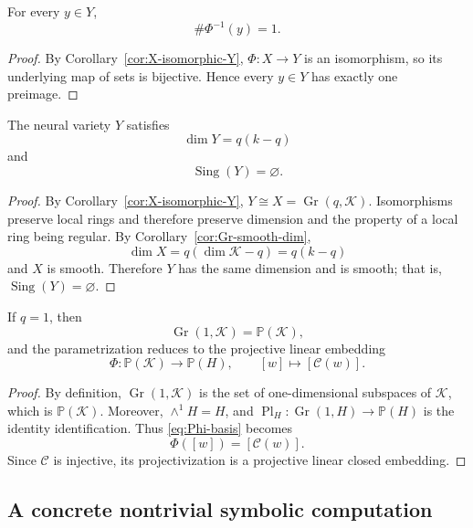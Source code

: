 \documentclass{siamonline250211}
\newcommand{\PP}{\mathbb P}
\newcommand{\Gr}{\operatorname{Gr}}
\newcommand{\Pl}{\operatorname{Pl}}
\newcommand{\Sing}{\operatorname{Sing}}
\newcommand{\cK}{\mathcal K}
\newcommand{\cC}{\mathcal C}
\begin{document}
\begin{corollary}\label{cor:fibers}
For every $y\in Y$,
\[
  \#\Phi^{-1}(y)=1.
\]
\end{corollary}

\begin{proof}
By Corollary~\ref{cor:X-isomorphic-Y}, $\Phi:X\to Y$ is an isomorphism, so its
underlying map of sets is bijective. Hence every $y\in Y$ has exactly one
preimage.
\end{proof}

\begin{corollary}\label{cor:Y-smooth}
The neural variety $Y$ satisfies
\[
  \dim Y=q(k-q)
\]
and
\[
  \Sing(Y)=\varnothing.
\]
\end{corollary}

\begin{proof}
By Corollary~\ref{cor:X-isomorphic-Y}, $Y\cong X=\Gr(q,\cK)$. Isomorphisms
preserve local rings and therefore preserve dimension and the property of a
local ring being regular. By Corollary~\ref{cor:Gr-smooth-dim},
\[
  \dim X=q(\dim\cK-q)=q(k-q)
\]
and $X$ is smooth. Therefore $Y$ has the same dimension and is smooth; that is,
$\Sing(Y)=\varnothing$.
\end{proof}

\begin{corollary}\label{cor:q-one}
If $q=1$, then
\[
  \Gr(1,\cK)=\PP(\cK),
\]
and the parametrization reduces to the projective linear embedding
\[
  \Phi:\PP(\cK)\longrightarrow\PP(H),
  \qquad[w]\longmapsto[\cC(w)].
\]
\end{corollary}

\begin{proof}
By definition, $\Gr(1,\cK)$ is the set of one-dimensional subspaces of $\cK$,
which is $\PP(\cK)$. Moreover, $\wedge^1H=H$, and
$\Pl_H:\Gr(1,H)\to\PP(H)$ is the identity identification. Thus
\eqref{eq:Phi-basis} becomes
\[
  \Phi([w])=[\cC(w)].
\]
Since $\cC$ is injective, its projectivization is a projective linear closed
embedding.
\end{proof}

\subsection{A concrete nontrivial symbolic computation}
\label{subsec:symbolic-example}
\end{document}
